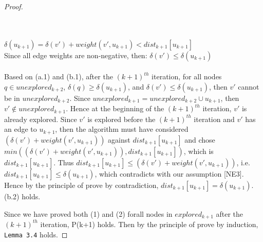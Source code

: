 \begin{proof}
\begin{itemize}
  \\\\
  \ftab $\delta(u_{k+1}) = \delta(v') + weight(v', u_{k+1}) < dist_{k+1}[u_{k+1}]$ \\
  \tab\tab\tab Since all edge weights are non-negative, then: $\delta(v') \leq \delta(u_{k+1})$
  \\\\
  Based on (a.1) and (b.1), after the $(k+1)^{th}$ iteration, for all nodes $q \in unexplored_{k+2}$, $\delta(q) \geq \delta(u_{k+1})$, and $\delta(v') \leq \delta(u_{k+1})$, then $v'$ cannot be in $unexplored_{k+2}$. Since $unexplored_{k+1} = unexplored_{k+2} \cup u_{k+1}$, then $v' \notin unexplored_{k+1}$. Hence at the beginning of the $(k+1)^{th}$ iteration, $v'$ is already explored. Since $v'$ is explored before the $(k+1)^{th}$ iteration and $v'$ has an edge to $u_{k+1}$, then the algorithm must have considered $(\delta(v') + weight(v', u_{k+1}))$ against $dist_{k+1}[u_{k+1}]$ and chose $min((\delta(v') + weight(v', u_{k+1})), dist_{k+1}[u_{k+1}])$, which is $dist_{k+1}[u_{k+1}]$. Thus $dist_{k+1}[u_{k+1}] \leq (\delta(v') + weight(v', u_{k+1}))$, i.e. $dist_{k+1}[u_{k+1}] \leq \delta(u_{k+1})$, which contradicts with our assumption [NE3]. Hence by the principle of prove by contradiction, $dist_{k+1}[u_{k+1}] = \delta(u_{k+1})$. (b.2) holds. 
\end{itemize}
Since we have proved both (1) and (2) forall nodes in $explored_{k+1}$ after the $(k+1)^{th}$ iteration, P(k+1) holds. Then by the principle of prove by induction, \texttt{Lemma 3.4} holds. 
\end{proof}